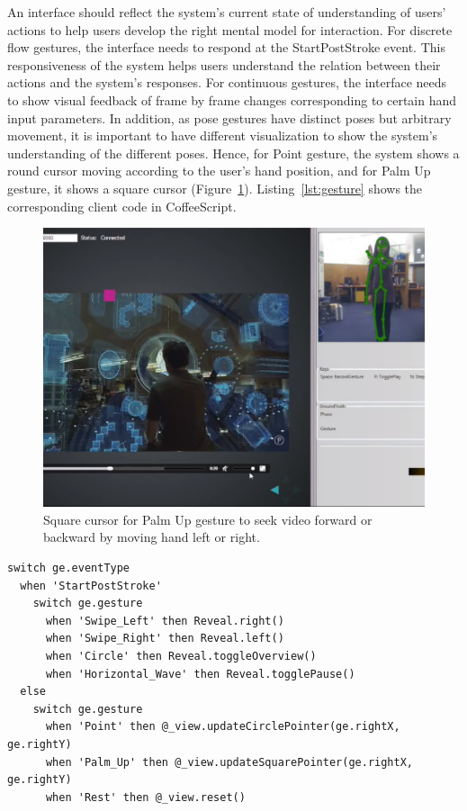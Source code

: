 An interface
should reflect the system's current state of understanding of users'
actions to help users develop the right mental model for interaction. For
discrete flow gestures, the interface needs to respond at the StartPostStroke
event. This responsiveness of the system helps users understand the relation
between their actions and the system's responses. For continuous gestures, the
interface needs to show visual feedback of frame by frame changes
corresponding to certain hand input parameters. In addition, as pose gestures
have distinct poses but arbitrary movement, it is important to have different 
visualization to show the system's understanding of the different
poses. Hence, for Point gesture, the system shows a round cursor moving
according to the user's hand position, and for Palm Up gesture, it shows a
square cursor (Figure~\ref{fig:palm-up}).
Listing~\ref{lst:gesture} shows the corresponding client code in CoffeeScript.

\begin{figure}[tbh]
\centering
\includegraphics[trim=0 2.7cm 0 0,
clip, width=\columnwidth]{figures/video_control.PNG}
\caption{Square cursor for Palm Up gesture to seek video forward or backward by
moving hand left or right.}
\label{fig:palm-up}
\end{figure}

\begin{lstlisting}[caption={Client code mapping gesture events to actions.},
label={lst:client-code}] 
switch ge.eventType
  when 'StartPostStroke'
    switch ge.gesture
      when 'Swipe_Left' then Reveal.right()
      when 'Swipe_Right' then Reveal.left()
      when 'Circle' then Reveal.toggleOverview()
      when 'Horizontal_Wave' then Reveal.togglePause()
  else
    switch ge.gesture
      when 'Point' then @_view.updateCirclePointer(ge.rightX, ge.rightY)
      when 'Palm_Up' then @_view.updateSquarePointer(ge.rightX, ge.rightY)
      when 'Rest' then @_view.reset()
\end{lstlisting}

